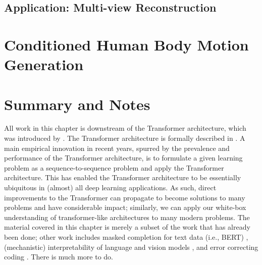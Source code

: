 \documentclass[../../book-main.tex]{subfiles}
\begin{document}
\subsection{Application: Multi-view Reconstruction}\label{sub:cupid_application_mv}



\section{Conditioned Human Body Motion Generation}



\section{Summary and Notes}

All work in this chapter is downstream of the Transformer architecture, which was introduced by \citet{vaswani2017attention}. The Transformer architecture is formally described in . A main empirical innovation in recent years, spurred by the prevalence and performance of the Transformer architecture, is to formulate a given learning problem as a sequence-to-sequence problem and apply the Transformer architecture. This has enabled the Transformer architecture to be essentially ubiquitous in (almost) all deep learning applications. As such, direct improvements to the Transformer can propagate to become solutions to many problems and have considerable impact; similarly, we can apply our white-box understanding of transformer-like architectures to many modern problems. The material covered in this chapter is merely a subset of the work that has already been done; other work includes masked completion for text data (i.e., BERT) \citep{devlin2019bert,yu2024white}, (mechanistic) interpretability of language and vision models \citep{bai2024improving}, and error correcting coding \citep{zheng2025white}. There is much more to do.
\end{document}
